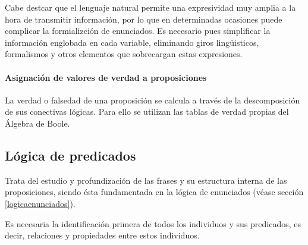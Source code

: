 \documentclass[a4paper, 11pt, titlepage]{article}
\begin{document}
                Cabe destcar que el lenguaje natural permite una expresividad muy amplia a la hora de 
                transmitir información, por lo que en determinadas ocasiones puede complicar la 
                formializción de enunciados. Es necesario pues simplificar la información englobada en 
                cada variable, eliminando giros lingüisticos, formalismos y otros elementos que 
                sobrecargan estas expresiones.

            \paragraph{Asignación de valores de verdad a proposiciones}

                La verdad o falsedad de una proposición se calcula a través de la descomposición
                de sus conectivas lógicas. Para ello se utilizan las tablas de verdad propias del 
                Álgebra de Boole. 


    \subsection{Lógica de predicados}

        Trata del estudio y profundización de las frases y su estructura interna de las proposiciones, 
        siendo ésta fundamentada en la lógica de enunciados (véase sección \ref{logicaenunciados}).

        Es necesaria la identificación primera de todos los individuos y sus predicados, es decir, 
        relaciones y propiedades entre estos individuos.
\end{document}
